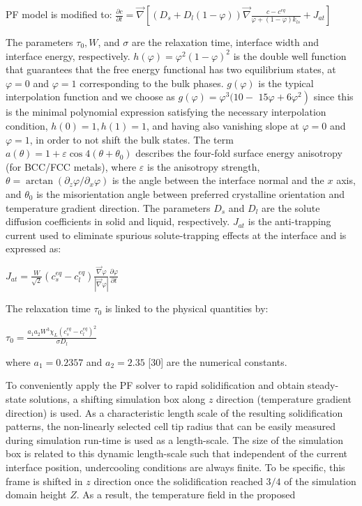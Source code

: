 \documentclass[10pt]{article}
\begin{document}
PF model is modified to: $\frac{\partial c}{\partial t}=\vec{\nabla}\left[\left(D_{s}+D_{l}(1-\varphi)\right) \vec{\nabla} \frac{c-c^{e q}}{\varphi+(1-\varphi) k_{l s}}+J_{a t}\right]$

The parameters $\tau_{0}, W$, and $\sigma$ are the relaxation time, interface width and interface energy, respectively. $h(\varphi)=\varphi^{2}(1-\varphi)^{2}$ is the double well function that guarantees that the free energy functional has two equilibrium states, at $\varphi=0$ and $\varphi=1$ corresponding to the bulk phases. $g(\varphi)$ is the typical interpolation function and we choose as $g(\varphi)=\varphi^{3}(10-$ $\left.15 \varphi+6 \varphi^{2}\right)$ since this is the minimal polynomial expression satisfying the necessary interpolation condition, $h(0)=1, h(1)=1$, and having also vanishing slope at $\varphi=0$ and $\varphi=1$, in order to not shift the bulk states. The term $a(\theta)=1+\varepsilon \cos 4\left(\theta+\theta_{0}\right)$ describes the four-fold surface energy anisotropy (for BCC/FCC metals), where $\varepsilon$ is the anisotropy strength, $\theta=\arctan \left(\partial_{z} \varphi / \partial_{x} \varphi\right)$ is the angle between the interface normal and the $x$ axis, and $\theta_{0}$ is the misorientation angle between preferred crystalline orientation and temperature gradient direction. The parameters $D_{s}$ and $D_{l}$ are the solute diffusion coefficients in solid and liquid, respectively. $J_{a t}$ is the anti-trapping current used to eliminate spurious solute-trapping effects at the interface and is expressed as:

$J_{a t}=\frac{W}{\sqrt{2}}\left(c_{s}^{e q}-c_{l}^{e q}\right) \frac{\vec{\nabla} \varphi}{|\vec{\nabla} \varphi|} \frac{\partial \varphi}{\partial t}$

The relaxation time $\tau_{0}$ is linked to the physical quantities by:

$\tau_{0}=\frac{a_{1} a_{2} W^{3} \chi_{L}\left(c_{s}^{e q}-c_{l}^{e q}\right)^{2}}{\sigma D_{l}}$

where $a_{1}=0.2357$ and $a_{2}=2.35$ [30] are the numerical constants.

To conveniently apply the PF solver to rapid solidification and obtain steady-state solutions, a shifting simulation box along $z$ direction (temperature gradient direction) is used. As a characteristic length scale of the resulting solidification patterns, the non-linearly selected cell tip radius that can be easily measured during simulation run-time is used as a length-scale. The size of the simulation box is related to this dynamic length-scale such that independent of the current interface position, undercooling conditions are always finite. To be specific, this frame is shifted in $z$ direction once the solidification reached $3 / 4$ of the simulation domain height $Z$. As a result, the temperature field in the proposed
\end{document}

